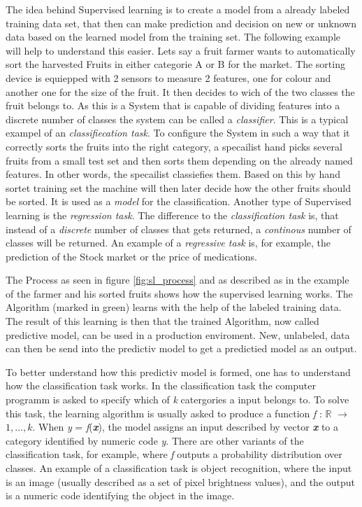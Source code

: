 \documentclass[12pt,oneside,a4paper,parskip]{scrbook}
\newcommand{\R}{\mathbb{R}}
\begin{document}
The idea behind Supervised learning is to create a model from a already labeled training data set, that then can make 
prediction and decision on new or unknown data based on the learned model from the training set. 
The following example will help to understand this easier.
Lets say a fruit farmer wants to automatically sort the harvested Fruits in either categorie A or B for the market. 
The sorting device is equiepped with 2 sensors to measure 2 features, one for colour and another one for the size of the 
fruit. It then decides to wich of the two classes the fruit belongs to. As this is a System that is capable of dividing 
features into a discrete number of classes the system can be called a \textit{classifier}. 
This is a typical exampel of an \textit{classifiecation task}.
To configure the System in such a way that it correctly sorts the fruits into the right category, 
a specailist hand picks several fruits from a small test set and then sorts them depending on the already named features. 
In other words, the specailist classiefies them. Based on this by hand sortet training set the machine will then later 
decide how the other fruits should be sorted. It is used as a \textit{model} for the classification. \cite{IntroAI}
Another type of Supervised learning is the \textit{regression task}. The difference to the \textit{classification task} is, 
that instead of a \textit{discrete} number of classes that gets returned, a \textit{continous} number of classes will be 
returned. An example of a \textit{regressive task} is, for example, the prediction of the Stock market or the price of 
medications.

The Process as seen in figure \ref{fig:sl_process} and as described as in the example of the farmer and his sorted 
fruits shows how the supervised learning works. The Algorithm (marked in green) learns with the help of the labeled 
training data. The result of this learning is then that the trained Algorithm, now called predictive model, 
can be used in a production enviroment.
New, unlabeled, data can then be send into the predictiv model to get a predictied model as an output. \cite{PythonML}

To better understand how this predictiv model is formed, one has to understand how the classification task works. 
In the classification task the computer programm is asked to specify which of \textit{k} catergories a input belongs to. 
To solve this task, the learning algorithm is usually asked to produce a function \textit{f} : $\R{}$ $\rightarrow$ ${1,...,k}$. 
When \textit{y} = \textit{f}(\textit{\textbf{x}}), the model assigns an input described by vector \textit{\textbf{x}} to a 
category identiﬁed by numeric code \textit{y}.
There are other variants of the classiﬁcation task, for example, where \textit{f} outputs a probability distribution over 
classes. An example of a classiﬁcation task is object recognition, where the input is an image (usually described as a set 
of pixel brightness values), and the output is a numeric code identifying the object in the image. \cite{Goodfellow-et-al-2016}
\end{document}
